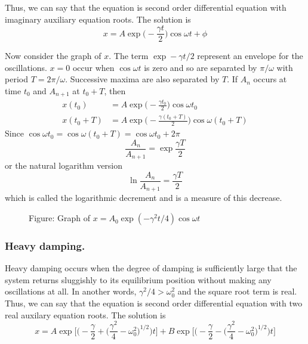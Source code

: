 \documentclass[../../../main.tex]{subfiles}
\begin{document}
Thus, we can say that the equation is second order differential equation with imaginary auxiliary equation roots. The solution is
\begin{equation*}
    x=A\exp\biggl(-\frac{\gamma t}{2}\biggr)\cos\omega t +\phi
\end{equation*} 

Now consider the graph of $x$. The term $\exp -\gamma t/2$ represent an envelope for the oscillations. $x=0$ occur when $\cos\omega t$ is zero and so are separated by $\pi/\omega$ with period $T=2\pi/\omega$. Successive maxima are also separated by $T$. If $A_n$ occurs at time $t_0$ and $A_{n+1}$ at $t_0+T$, then 
\begin{align*}
    x(t_0)&=A\exp\biggl(-\frac{\gamma t_0}{2}\biggr)\cos\omega t_0\\
    x(t_0+T)&=A\exp\biggl(-\frac{\gamma (t_0+T)}{2}\biggr)\cos\omega (t_0+T)
\end{align*}
Since $\cos\omega t_0=\cos\omega (t_0+T)=\cos\omega t_0+2\pi$
\begin{equation*}
    \frac{A_n}{A_{n+1}}=\exp \frac{\gamma T}{2}
\end{equation*} 
or the natural logarithm version
\begin{equation*}
    \ln \frac{A_n}{A_{n+1}}=\frac{\gamma T}{2}
\end{equation*}
which is called the logarithmic decrement and is a measure of this decrease. 
\begin{figure}[b]
    \centering
    \caption*{Figure: Graph of $x=A_0\exp(-\gamma^2t/4)\cos \omega t$}
\end{figure}

\subsubsection{Heavy damping.} Heavy damping occurs when the degree of damping is sufficiently large that the system returns sluggishly to its equilibrium position without making any oscillations at all. In another words, $\gamma^2/4 > \omega_0^2$ and the square root term is real. Thus, we can say that the equation is second order differential equation with two real auxilary equation roots. The solution is
\begin{equation*}
    x=A\exp \biggl[\bigg(-\frac{\gamma}{2} + \big(\frac{\gamma^2}{4}-\omega_0^2\big)^{1/2}\bigg)t\biggr] +B \exp \biggl[\bigg(-\frac{\gamma}{2} - \big(\frac{\gamma^2}{4}-\omega_0^2\big)^{1/2}\bigg)t\biggr]
\end{equation*}
\end{document}
